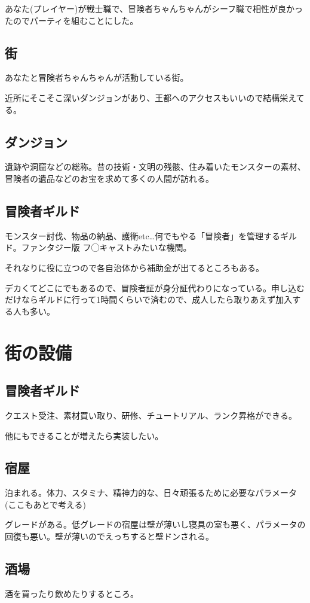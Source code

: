 \documentclass{mynote}
\begin{document}
あなた(プレイヤー)が戦士職で、冒険者ちゃんちゃんがシーフ職で相性が良かったのでパーティを組むことにした。

\subsection{街}
あなたと冒険者ちゃんちゃんが活動している街。

近所にそこそこ深いダンジョンがあり、王都へのアクセスもいいので結構栄えてる。

\subsection{ダンジョン}
遺跡や洞窟などの総称。昔の技術・文明の残骸、住み着いたモンスターの素材、冒険者の遺品などのお宝を求めて多くの人間が訪れる。

\subsection{冒険者ギルド}
モンスター討伐、物品の納品、護衛etc\dots 何でもやる「冒険者」を管理するギルド。ファンタジー版 フ◯キャストみたいな機関。

それなりに役に立つので各自治体から補助金が出てるところもある。

デカくてどこにでもあるので、冒険者証が身分証代わりになっている。申し込むだけならギルドに行って1時間くらいで済むので、成人したら取りあえず加入する人も多い。

\section{街の設備}
\subsection{冒険者ギルド}
クエスト受注、素材買い取り、研修、チュートリアル、ランク昇格ができる。

他にもできることが増えたら実装したい。

\subsection{宿屋}
泊まれる。体力、スタミナ、精神力的な、日々頑張るために必要なパラメータ(ここもあとで考える)

グレードがある。低グレードの宿屋は壁が薄いし寝具の室も悪く、パラメータの回復も悪い。壁が薄いのでえっちすると壁ドンされる。

\subsection{酒場}
酒を買ったり飲めたりするところ。
\end{document}
